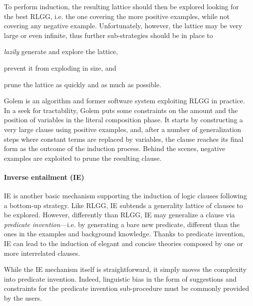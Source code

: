 \documentclass[12pt,a4paper,openright,twoside]{book}
\begin{document}
To perform induction, the resulting lattice should then be explored looking for the best RLGG, i.e. the one covering the more positive examples, while not covering any negative example.
%
Unfortunately, however, the lattice may be very large or even infinite, thus further sub-strategies should be in place to
%
%
\begin{inlinelist}
    \item \emph{lazily} generate and explore the lattice,
    \item prevent it from exploding in size, and
    \item prune the lattice as quickly and as much as possible.
\end{inlinelist}

Golem \cite{MuggletonF1990} is an algorithm and former software system exploiting RLGG in practice.
%
In a seek for tractability, Golem puts some constraints on the amount and the position of variables in the literal composition phase.
%
It starts by constructing a very large clause using positive examples, and, after a number of generalization steps where constant terms are replaced by variables, the clause reaches its final form as the outcome of the induction process.
%
Behind the scenes, negative examples are exploited to prune the resulting clause.

\paragraph{Inverse entailment (IE)}

IE \cite{Muggleton95} is another basic mechanism supporting the induction of logic clauses following a bottom-up strategy.
%
Like RLGG, IE subtends a generality lattice of clauses to be explored.
%
However, differently than RLGG, IE may generalize a clause via \emph{predicate invention}---i.e. by generating a bare new predicate, different than the ones in the examples and background knowledge.
%
Thanks to predicate invention, IE can lead to the induction of elegant and concise theories composed by one or more interrelated clauses.

While the IE mechanism itself is straightforward, it simply moves the complexity into predicate invention.
%
Indeed, linguistic bias in the form of suggestions and constraints for the predicate invention sub-procedure must be commonly provided by the users.
\end{document}
